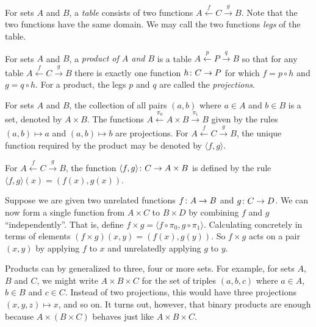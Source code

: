 \begin{defn}
For sets $A$ and $B$, a \emph{table} consists of two functions $A\stackrel{f}{\longleftarrow} C\stackrel{g}{\longrightarrow}B$.
Note that the two functions have the same domain. We may call the two functions \emph{legs} of the table.

For sets $A$ and $B$, a \emph{product of $A$ and $B$} is a table $A\stackrel{p}{\longleftarrow} P\stackrel{q}{\longrightarrow}B$ so that for any table $A\stackrel{f}{\longleftarrow} C\stackrel{g}{\longrightarrow}B$ there is exactly one function ${h}\colon{C}\to{P}$ for which $f = p\circ h$ and $g= q\circ h$. 
For a product, the legs $p$ and $q$ are called the \emph{projections}.
\end{defn}

\begin{principle}\label{ax:products}
	For sets $A$ and $B$, the collection of all pairs $(a,b)$ where $a\in A$ and $b\in B$ is a set, denoted by $A\times B$. 
	The functions $A\stackrel{\pi_0}{\longleftarrow}{A\times B}\stackrel{\pi_1}{\longrightarrow}B$ given by the rules $(a,b)\mapsto a$
	and $(a,b)\mapsto b$ are projections. For $A\stackrel{f}{\longleftarrow}{C}\stackrel{g}{\longrightarrow}B$, the unique function required by
	the product may be denoted by $\langle f,g\rangle$.

	For $A\stackrel{f}{\longleftarrow}{C}\stackrel{g}{\longrightarrow}B$, the function ${\langle f,g\rangle}\colon{C}\to{A\times B}$ is defined by the rule $\langle f,g\rangle(x)=(f(x),g(x))$.
\end{principle}

Suppose we are given two unrelated functions ${f}\colon{A}\to{B}$ and ${g}\colon{C}\to{D}$. 
We can now form a single function from $A\times C$ to $B\times D$ by combining $f$ and $g$ ``independently''. 
That is, define $f\times g = \langle f\circ \pi_0,g\circ \pi_1\rangle$.
Calculating concretely in terms of elements $(f\times g)(x,y) = (f(x),g(y))$. 
So $f\times g$ acts on a pair $(x,y)$ by applying $f$ to $x$ and unrelatedly applying $g$ to $y$. 

Products can by generalized to three, four or more sets.
For example, for sets $A$, $B$ and $C$, we might write $A\times B\times C$ for the set of triples $(a,b,c)$ where $a\in A$, $b\in B$ and $c\in C$. 
Instead of two projections, this would have three projections $(x,y,z)\mapsto x$, and so on. 
It turns out, however, that binary products are enough because $A\times (B\times C)$ behaves just like $A\times B\times C$.

